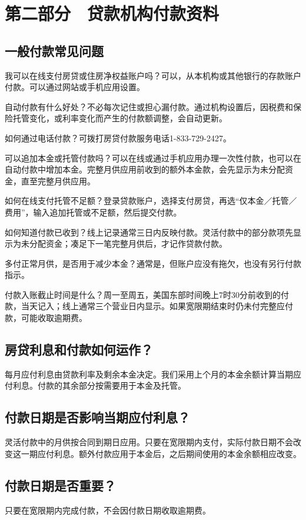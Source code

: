 \documentclass[UTF8,fontset=none,11pt,a4paper]{ctexart}
\begin{document}
\section*{第二部分　贷款机构付款资料}
\subsection*{一般付款常见问题}
我可以在线支付房贷或住房净权益账户吗？可以，从本机构或其他银行的存款账户付款。可以通过网站或手机应用设置。


自动付款有什么好处？不必每次记住或担心漏付款。通过机构设置后，因税费和保险托管变化，或利率变化而产生的付款额调整，会自动更新。


如何通过电话付款？可拨打房贷付款服务电话1-833-729-2427。


可以追加本金或托管付款吗？可以在线或通过手机应用办理一次性付款，也可以在自动付款中增加本金。完整月供应用前收到的额外本金款，会先显示为未分配资金，直至完整月供应用。


如何在线支付托管不足额？登录贷款账户，选择支付房贷，再选“仅本金／托管／费用”，输入追加托管或不足额，然后提交付款。


如何知道付款已收到？线上记录通常三日内反映付款。灵活付款中的部分款项先显示为未分配资金；凑足下一笔完整月供后，才记作贷款付款。


多付正常月供，是否用于减少本金？通常是，但账户应没有拖欠，也没有另行付款指示。


付款入账截止时间是什么？周一至周五，美国东部时间晚上7时30分前收到的付款，当天记入；线上通常三个营业日内显示。如果宽限期结束时仍未付完整应付款，可能收取逾期费。


\subsection*{房贷利息和付款如何运作？}
每月应付利息由贷款利率及剩余本金决定。我们采用上个月的本金余额计算当期应付利息。付款的其余部分按需要用于本金及托管。


\subsection*{付款日期是否影响当期应付利息？}
灵活付款中的月供按合同到期日应用。只要在宽限期内支付，实际付款日期不会改变这一期应付利息。额外付款应用于本金后，之后期间使用的本金余额相应改变。


\subsection*{付款日期是否重要？}
只要在宽限期内完成付款，不会因付款日期收取逾期费。
\end{document}
